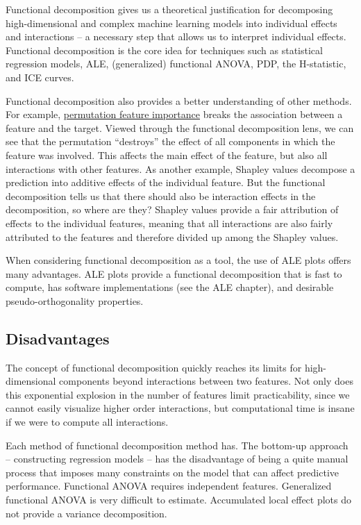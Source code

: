 \documentclass[
  12pt,
]{krantz}
\begin{document}
Functional decomposition gives us a theoretical justification for decomposing high-dimensional and complex machine learning models into individual effects and interactions -- a necessary step that allows us to interpret individual effects.
Functional decomposition is the core idea for techniques such as statistical regression models, ALE, (generalized) functional ANOVA, PDP, the H-statistic, and ICE curves.

Functional decomposition also provides a better understanding of other methods.
For example, \protect\hyperlink{feature-importance}{permutation feature importance} breaks the association between a feature and the target.
Viewed through the functional decomposition lens, we can see that the permutation ``destroys'' the effect of all components in which the feature was involved.
This affects the main effect of the feature, but also all interactions with other features.
As another example, Shapley values decompose a prediction into additive effects of the individual feature.
But the functional decomposition tells us that there should also be interaction effects in the decomposition, so where are they?
Shapley values provide a fair attribution of effects to the individual features, meaning that all interactions are also fairly attributed to the features and therefore divided up among the Shapley values.

When considering functional decomposition as a tool, the use of ALE plots offers many advantages.
ALE plots provide a functional decomposition that is fast to compute, has software implementations (see the ALE chapter), and desirable pseudo-orthogonality properties.

\hypertarget{disadvantages-8}{%
\subsection{Disadvantages}\label{disadvantages-8}}

The concept of functional decomposition quickly reaches its limits for high-dimensional components beyond interactions between two features.
Not only does this exponential explosion in the number of features limit practicability, since we cannot easily visualize higher order interactions, but computational time is insane if we were to compute all interactions.

Each method of functional decomposition method has.
The bottom-up approach -- constructing regression models -- has the disadvantage of being a quite manual process that imposes many constraints on the model that can affect predictive performance.
Functional ANOVA requires independent features.
Generalized functional ANOVA is very difficult to estimate.
Accumulated local effect plots do not provide a variance decomposition.
\end{document}
